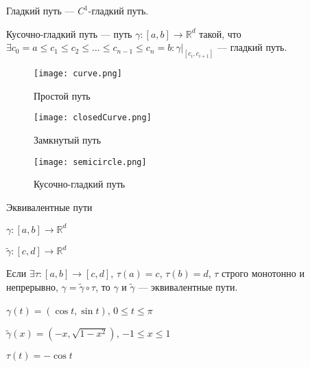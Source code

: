     \begin{Def}
    
        Гладкий путь --- $C^1$-гладкий путь.
    
    \end{Def}   

    \begin{Def}
  
        Кусочно-гладкий путь --- путь $\gamma \colon [a, b] \rightarrow \mathbb{R}^d$ такой, что $\exists c_0=a \le c_1 \le c_2 \le \dots \le c_{n-1} \le c_n = b \colon \gamma|_{[c_i, c_{i+1}]}$ --- гладкий путь.
    
    \end{Def}   

    \begin{figure}[h]
        \begin{center}
            \begin{minipage}[h]{0.15\linewidth}
                \texttt{[image: curve.png]}
                \caption{Простой путь}
            \end{minipage}
            \begin{minipage}[h]{0.3\linewidth}
                \texttt{[image: closedCurve.png]}
                \caption{Замкнутый путь}
            \end{minipage}
            \begin{minipage}[h]{0.3\linewidth}
                \texttt{[image: semicircle.png]}
                \caption{Кусочно-гладкий путь}
            \end{minipage}
        \end{center}
    \end{figure}

    \begin{Def}

        Эквивалентные пути

        $\gamma \colon [a, b] \rightarrow \mathbb{R}^d$

        $\widetilde{\gamma} \colon [c, d] \rightarrow \mathbb{R}^d$

        Если $\exists \tau \colon [a, b] \rightarrow [c, d]$, $\tau(a) = c$, $\tau(b)=d$, $\tau$ строго монотонно и непрерывно, $\gamma = \widetilde{\gamma} \circ \tau$, то
        $\gamma$ и $\widetilde{\gamma}$ --- эквивалентные пути.
    
    \end{Def}

    \begin{exmp}
    
        $\gamma(t) = (\cos t, \sin t)$, $0 \le t \le \pi$

        $\widetilde{\gamma}(x) = (-x, \sqrt{1 - x^2})$, $-1 \le x \le 1$
    
        $\tau(t) = -\cos t$
    
    \end{exmp}

